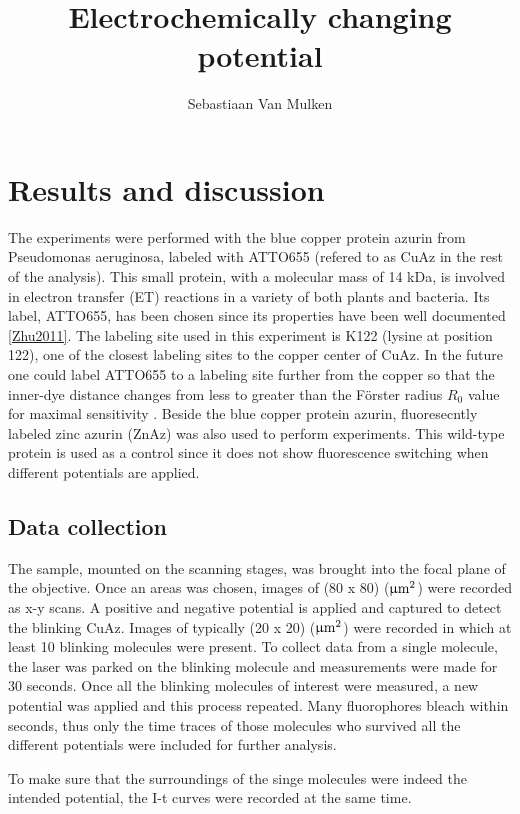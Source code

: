 \documentclass[twoside,single]{lion-msc}
\title{Electrochemically changing potential}
\author{Sebastiaan Van Mulken}
\begin{document}
\maketitle

\chapter{Results and discussion}

The experiments were performed with the blue copper protein azurin from Pseudomonas aeruginosa, labeled with ATTO655 (refered to as CuAz in the rest of the analysis). This small protein, with a molecular mass of 14 kDa, is involved in electron transfer (ET) reactions in a variety of both plants and bacteria. Its label, ATTO655, has been chosen since its properties have been well documented \ref{Zhu2011}. The labeling site used in this experiment is K122 (lysine at position 122), one of the closest labeling sites to the copper center of CuAz. In the future one could label ATTO655 to a labeling site further from the copper so that the inner-dye distance changes from less to greater than the F\"{o}rster radius $R_{0}$ value for maximal sensitivity \cite{Roy2008}. 
Beside the blue copper protein azurin, fluoresecntly labeled zinc azurin (ZnAz) was also used to perform experiments. This wild-type protein is used as a control since it does not show fluorescence switching when different potentials are applied.

\section*{Data collection} \label{data_coll}
The sample, mounted on the scanning stages, was brought into the focal plane of the objective. Once an areas was chosen, images of (80 x 80) ($\upmu \textup{m}^{2}$) were recorded as x-y scans. A positive and negative potential is applied and captured to detect the blinking CuAz. Images of typically (20 x 20) ($\upmu \textup{m}^{2}$) were recorded in which at least 10 blinking molecules were present. To collect data from a single molecule, the laser was parked on the blinking molecule and measurements were made for 30 seconds. Once all the blinking molecules of interest were measured, a new potential was applied and this process repeated. Many fluorophores bleach within seconds, thus only the time traces of those molecules who survived all the different potentials were included for further analysis. 

To make sure that the surroundings of the singe molecules were indeed the intended potential, the I-t curves were recorded at the same time.
\end{document}
